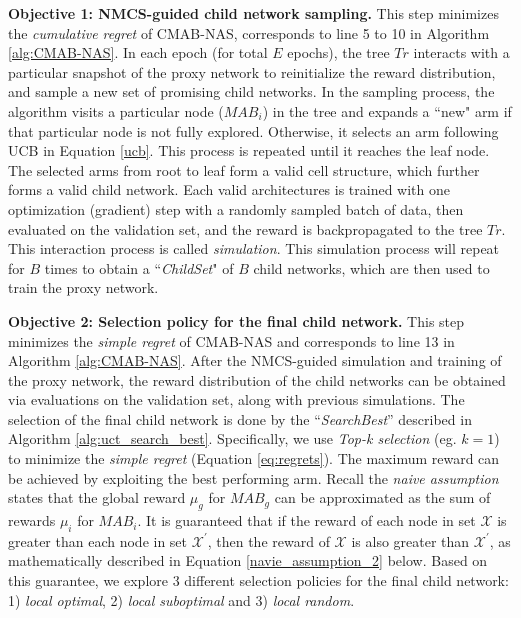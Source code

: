 \documentclass[conference]{IEEEtran}
\begin{document}
\noindent\textbf{Objective 1: NMCS-guided child network sampling.}
This step minimizes the \emph{cumulative regret} of CMAB-NAS,  corresponds to line 5 to 10 in Algorithm \ref{alg:CMAB-NAS}.
In each epoch (for total $E$ epochs), the tree $Tr$ interacts with a particular snapshot of the proxy network to reinitialize the reward distribution, and sample a new set of promising child networks. In the sampling process, the algorithm visits a particular node ($MAB_i$) in the tree and expands a ``new" arm if that particular node is not fully explored. Otherwise, it selects an arm following UCB in Equation \eqref{ucb}. This process is repeated until it reaches the leaf node. The selected arms from root to leaf form a valid cell structure, which further forms a valid child network. Each valid architectures is trained with one optimization (gradient) step with a randomly sampled batch of data, then evaluated on the validation set, and the reward is backpropagated to the tree $Tr$. This interaction process is called \emph{simulation}. This simulation process will repeat for $B$ times to obtain a ``\emph{ChildSet}" of $B$ child networks, which are then used to train the proxy network.

\noindent\textbf{Objective 2: Selection policy for the final child network.}
This step minimizes the \emph{simple regret} of CMAB-NAS and corresponds to line 13 in Algorithm \ref{alg:CMAB-NAS}.
After the NMCS-guided simulation and training of the proxy network, the reward distribution of the child networks can be obtained via evaluations on the validation set, along with previous simulations.
The selection of the final child network is done by the ``\emph{SearchBest}'' described in Algorithm \ref{alg:uct_search_best}.
Specifically, we use \emph{Top-k selection} (eg. $k=1$) to minimize the \emph{simple regret} (Equation \eqref{eq:regrets}).
The maximum reward can be achieved by exploiting the best performing arm. Recall the \emph{naive assumption} states that the global reward $\mu_g$ for $MAB_g$ can be approximated as the sum of rewards $\mu_i$ for $MAB_i$. It is guaranteed that if the reward of each node in set \(\mathcal{X}\) is greater than each node in set \(\mathcal{X}^\prime\), then the reward of \(\mathcal{X}\) is also greater than \(\mathcal{X}^\prime\), as mathematically described in Equation \eqref{navie_assumption_2} below. Based on this guarantee, we explore 3 different selection policies for the final child network: 1) \emph{local optimal}, 2) \emph{local suboptimal} and 3) \emph{local random}.
\end{document}
